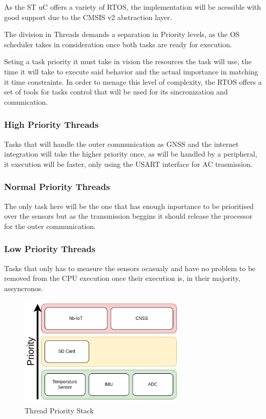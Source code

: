 As the ST uC offers a variety of RTOS, the implementation will be acessible with good support due to the
CMSIS v2 abstraction layer.

The division in Threads demands a separation in Priority levels, as the OS scheduler takes in consideration 
once both tasks are ready for execution.  

Seting a task priority it must take in vision the resources the task will use, the time it will take to execute said behavior
and the actual importance in matching it time constraints. In order to menage this level of complexity, the RTOS offers a set of
tools for tasks control that will be used for its sincronization and comunication.

\subsubsection{High Priority Threads}
Tasks that will handle the outer communication as GNSS and the internet integration will take the higher priority once, as will be handled
by a peripheral, it execution will be faster, only using the USART interface for AC trasmission. 

\subsubsection{Normal Priority Threads}
The only task here will be the one that has enough inportance to be prioritised over the sensors but as the transmission beggins it should release the processor
for the outer communication.

\subsubsection{Low Priority Threads}
Tasks that only has to measure the sensors ocasualy and have no problem to be removed from the CPU execution
once their execution is, in their majority, assyncronos.

\begin{figure}[H]
    \centering
    \includegraphics[width=0.7\textwidth]{images/diagrams/threads/thread.drawio.png}  %
    \caption{Thread Priority Stack}
    \label{fig:Thread Priority Stack}        
\end{figure}


